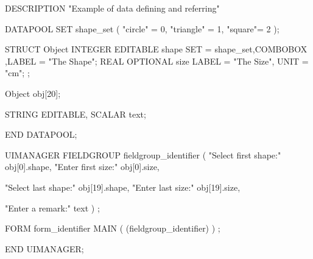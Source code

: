 \begin{boxedminipage}[t]{\linewidth}
\begin{intens}
DESCRIPTION "Example of data defining and referring"

DATAPOOL
  SET shape_set ( "circle" = 0, "triangle" = 1, "square"= 2 );

  STRUCT Object {
     INTEGER {EDITABLE}
        shape {SET = shape_set,COMBOBOX
              ,LABEL = "The Shape"};
     REAL {OPTIONAL}
        size  {LABEL = "The Size", UNIT = "cm"};
  };

  Object obj[20];

  STRING {EDITABLE, SCALAR}
     text;

END DATAPOOL;

UIMANAGER
  FIELDGROUP
    fieldgroup_identifier
    (
      "Select first shape:" obj[0].shape,
      "Enter first size:"   obj[0].size,

      "Select last shape:"  obj[19].shape,
      "Enter last size:"    obj[19].size,

      "Enter a remark:"     text
    )
  ;

  FORM
    form_identifier {MAIN}
    (
      (fieldgroup_identifier)
    )
  ;

END UIMANAGER;

\end{intens}
\end{boxedminipage}
